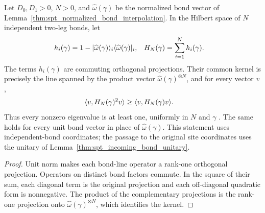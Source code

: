 \begin{lemma}
    \label{thm:spt_bond_product_parent_gap}
    \leanok
    Let $D_0,D_1>0$, $N>0$, and $\widehat\omega(\gamma)$ be the
    normalized bond vector of
    Lemma~\ref{thm:spt_normalized_bond_interpolation}. In the Hilbert
    space of $N$ independent two-leg bonds, let
    \begin{align}
        h_i(\gamma)                       & = 1-
        |\widehat\omega(\gamma)\rangle_i
        \langle\widehat\omega(\gamma)|_i, &
        H_N(\gamma)                       & = \sum_{i=1}^{N}h_i(\gamma).
        \notag
    \end{align}
    The terms $h_i(\gamma)$ are commuting orthogonal projections. Their
    common kernel is precisely the line spanned by the product vector
    $\widehat\omega(\gamma)^{\otimes N}$, and for every vector $v$,
    \begin{align}
        \langle v,H_N(\gamma)^2v\rangle
         & \geq \langle v,H_N(\gamma)v\rangle.
        \notag
    \end{align}
    Thus every nonzero eigenvalue is at least one, uniformly in $N$ and
    $\gamma$ \cite[Sections~II.D.2 and~II.F.2]{Schuch2011Phases}. The
    same holds for every unit bond vector in place of
    $\widehat\omega(\gamma)$. This statement uses independent-bond
    coordinates; the passage to the original site coordinates uses the
    unitary of Lemma~\ref{thm:spt_incoming_bond_unitary}.
\end{lemma}

\begin{proof}\leanok
    Unit norm makes each bond-line operator a rank-one orthogonal
    projection. Operators on distinct bond factors commute. In the square
    of their sum, each diagonal term is the original projection and each
    off-diagonal quadratic form is nonnegative. The product of the
    complementary projections is the rank-one projection onto
    $\widehat\omega(\gamma)^{\otimes N}$, which identifies the kernel.
\end{proof}

